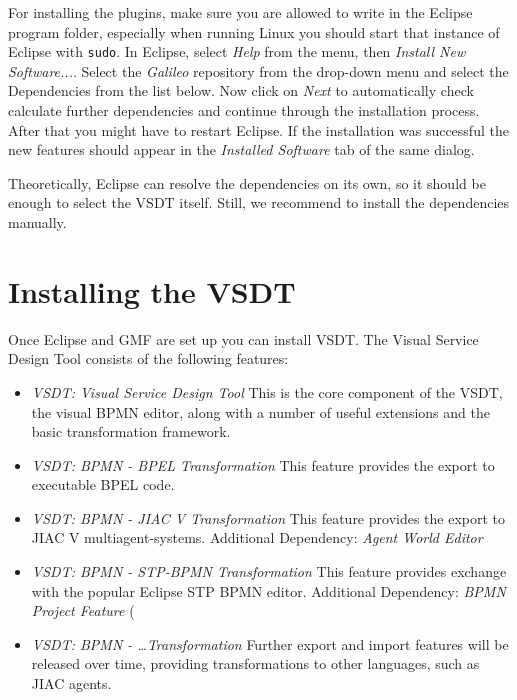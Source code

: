 For installing the plugins, make sure you are allowed to write in the Eclipse
program folder, especially when running Linux you should start that instance of
Eclipse with \texttt{sudo}.  In Eclipse, select \emph{Help} from the menu, then
\emph{Install New Software...}.  Select the \emph{Galileo} repository from the
drop-down menu and select the Dependencies from the list below.  Now click on
\emph{Next} to automatically check calculate further dependencies and continue
through the installation process.  After that you might have to restart Eclipse.
If the installation was successful the new features should appear in the
\emph{Installed Software} tab of the same dialog.

Theoretically, Eclipse can resolve the dependencies on its own, so it should be
enough to select the VSDT itself.  Still, we recommend to install the dependencies
manually.



\section{Installing the VSDT}
\label{sec:user_setup_vsdt}

Once Eclipse and GMF are set up you can install VSDT.  The Visual Service Design
Tool consists of the following features:

\begin{itemize}
	\item \emph{VSDT: Visual Service Design Tool} This is the core component of
	the VSDT, the visual BPMN editor, along with a number of useful extensions
	and the basic transformation framework.



	\item \emph{VSDT: BPMN - BPEL Transformation} This feature provides the export
	to executable BPEL code.

	\item \emph{VSDT: BPMN - JIAC V Transformation} This feature provides the
	export to JIAC V multiagent-systems.  Additional Dependency: \emph{Agent World
	Editor}

	\item \emph{VSDT: BPMN - STP-BPMN Transformation} This feature provides
	exchange with the popular Eclipse STP BPMN editor.  Additional Dependency:
	\emph{BPMN Project Feature} (

	\item \emph{VSDT: BPMN - \dots Transformation} Further export and import
	features will be released over time, providing transformations to other
	languages, such as JIAC agents.
\end{itemize}

